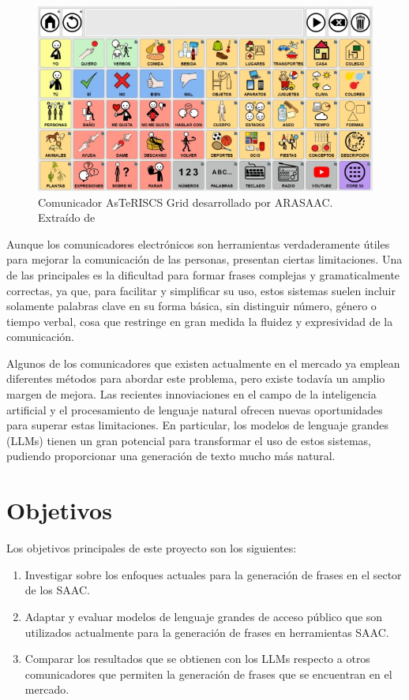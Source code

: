 \documentclass[11pt,spanish,listoffigures,listoftables]{tfgetsinf}
\begin{document}
\begin{figure}[h]
\includegraphics[scale = 0.8]{images/comunicador.jpg}
\centering
\caption{Comunicador AsTeRISCS Grid desarrollado por ARASAAC. Extraído de \cite{asterics_grid_comunicador}}
\label{fig:comunicador}
\end{figure}

Aunque los comunicadores electrónicos son herramientas verdaderamente útiles para mejorar la comunicación de las personas, presentan ciertas limitaciones. Una de las principales es la dificultad para formar frases complejas y gramaticalmente correctas, ya que, para facilitar y simplificar su uso, estos sistemas suelen incluir solamente palabras clave en su forma básica, sin distinguir número, género o tiempo verbal, cosa que restringe en gran medida la fluidez y expresividad de la comunicación.

Algunos de los comunicadores que existen actualmente en el mercado ya emplean diferentes métodos para abordar este problema, pero existe todavía un amplio margen de mejora. Las recientes innoviaciones en el campo de la inteligencia artificial y el procesamiento de lenguaje natural ofrecen nuevas oportunidades para superar estas limitaciones. En particular, los modelos de lenguaje grandes (LLMs) tienen un gran potencial para transformar el uso de estos sistemas, pudiendo proporcionar una generación de texto mucho más natural.

\section{Objetivos}

Los objetivos principales de este proyecto son los siguientes:
\begin{enumerate}
\item Investigar sobre los enfoques actuales para la generación de frases en el sector de los SAAC.
\item Adaptar y evaluar modelos de lenguaje grandes de acceso público que son utilizados actualmente para la generación de frases en herramientas SAAC.
\item Comparar los resultados que se obtienen con los LLMs respecto a otros comunicadores que permiten la generación de frases que se encuentran en el mercado.
\end{enumerate}
\end{document}
